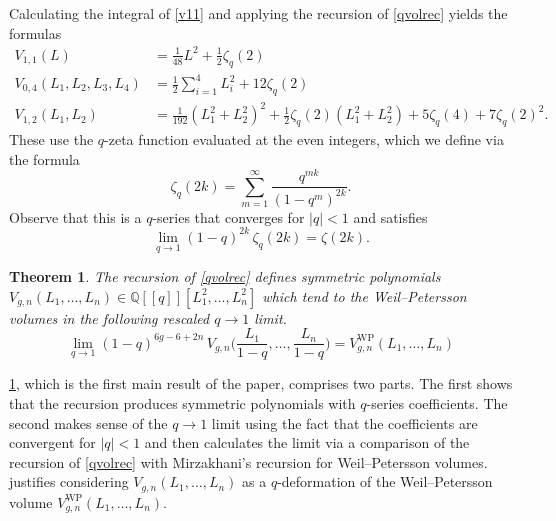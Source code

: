 \documentclass[a4paper]{article}
\theoremstyle{plain}
\newtheorem{theorem}{Theorem}
\theoremstyle{definition}
\newcommand{\bq}{\mathbb{Q}}
\begin{document}
Calculating the integral of \cref{v11} and applying the recursion of \cref{qvolrec} yields the formulas
\begin{align*}
V_{1,1}(L) &= \frac{1}{48} L^2 + \frac{1}{2} \zeta_q(2) \\
V_{0,4} (L_1, L_2, L_3, L_4) &= \frac{1}{2} \sum_{i=1}^4 L_i^2 + 12 \zeta_q(2) \\
V_{1,2}(L_1, L_2) &= \frac{1}{192} (L_1^2+L_2^2)^2 + \frac{1}{2} \zeta_q(2) (L_1^2+L_2^2) + 5\zeta_q(4) + 7\zeta_q(2)^2.
\end{align*}
These use the $q$-zeta function evaluated at the even integers, which we define via the formula
\begin{equation} \label{eq:qzeta}
\zeta_q(2k)=\sum_{m=1}^\infty \frac{q^{mk}}{(1-q^m)^{2k}}.
\end{equation}
Observe that this is a $q$-series that converges for $|q|<1$ and satisfies
\[
\lim_{q \to 1} (1-q)^{2k} \, \zeta_q(2k) = \zeta(2k).
\]


\begin{theorem} \label{thm:main}
The recursion of \cref{qvolrec} defines symmetric polynomials $V_{g,n}(L_1, \ldots, L_n) \in\bq[[q]][L_1^2, \ldots, L_n^2]$ which tend to the Weil--Petersson volumes in the following rescaled $q \to 1$ limit.
\[
\lim_{q \to 1} (1-q)^{6g-6+2n} \, V_{g,n} \Big( \frac{L_1}{1-q}, \ldots, \frac{L_n}{1-q} \Big) = V^{\mathrm{WP}}_{g,n}(L_1, \ldots, L_n)
\]
\end{theorem}


\cref{thm:main}, which is the first main result of the paper, comprises two parts. The first shows that the recursion produces symmetric polynomials with $q$-series coefficients. The second makes sense of the $q \to 1$ limit using the fact that the coefficients are convergent for $|q|<1$ and then calculates the limit via a comparison of the recursion of \cref{qvolrec} with Mirzakhani's recursion for Weil--Petersson volumes.  justifies considering $V_{g,n}(L_1, \ldots, L_n)$ as a $q$-deformation of the Weil--Petersson volume $V^{\mathrm{WP}}_{g,n}(L_1, \ldots, L_n)$.
\end{document}
